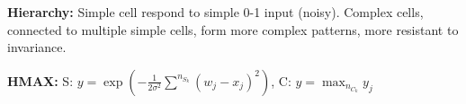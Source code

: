 \textbf{Hierarchy:} Simple cell respond to simple 0-1 input (noisy).  Complex cells, connected to multiple simple cells, form more complex patterns, more resistant to invariance.\\

\textbf{HMAX:} S: $y = \exp(- \frac{1}{2\sigma^2} \sum^{n_{S_k}} (w_j - x_j)^2)$, C: $y = \max_{n_{C_k}} y_j$\\


